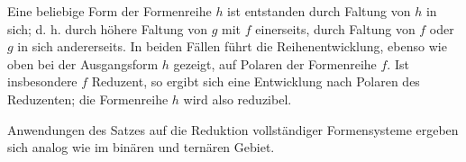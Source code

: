 Eine beliebige Form der Formenreihe $h$ ist entstanden durch Faltung von $h$ in sich; d. h. durch h\"ohere Faltung von $g$ mit $f$ einerseits, durch Faltung von $f$ oder $g$ in sich andererseits. In beiden F\"allen f\"uhrt die Reihenentwicklung, ebenso wie oben bei der Ausgangsform $h$ gezeigt, auf Polaren der Formenreihe $f$. Ist insbesondere $f$ Reduzent, so ergibt sich eine Entwicklung nach Polaren des Reduzenten; die Formenreihe $h$ wird also reduzibel.

Anwendungen des Satzes auf die Reduktion vollst\"andiger Formensysteme ergeben sich analog wie im bin\"aren und tern\"aren Gebiet.
